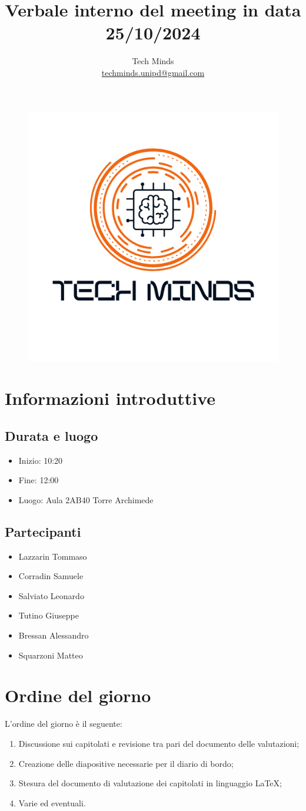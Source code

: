 \documentclass[10pt]{article}
\title{Verbale interno del meeting in data 25/10/2024}
\author{Tech Minds \\ \href{mailto:techminds.unipd@gmail.com}{techminds.unipd@gmail.com}}
\date{}
\begin{document}
\maketitle

\begin{figure}[h]
    \centering
    \includegraphics[width=0.3\linewidth]{../../../../assets/logo.png}
\end{figure}

\tableofcontents{\newpage}

\section{Informazioni introduttive}
\subsection{Durata e luogo}
\begin{itemize}
  \item Inizio: 10:20
  \item Fine: 12:00
  \item Luogo: Aula 2AB40 Torre Archimede
\end{itemize}
\subsection{Partecipanti}
\begin{itemize}
    \item Lazzarin Tommaso
    \item Corradin Samuele
    \item Salviato Leonardo
    \item Tutino Giuseppe
    \item Bressan Alessandro
    \item Squarzoni Matteo
\end{itemize}
\section{Ordine del giorno}
L'ordine del giorno è il seguente:
\begin{enumerate}
    \item Discussione sui capitolati e revisione tra pari del documento delle valutazioni;
    \item Creazione delle diapositive necessarie per il diario di bordo;
    \item Stesura del documento di valutazione dei capitolati in linguaggio LaTeX;
    \item Varie ed eventuali.
\end{enumerate}
\end{document}
